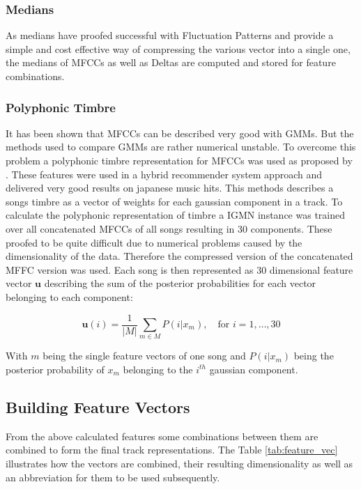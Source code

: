\documentclass[cic,tc,english]{iiufrgs}
\begin{document}
\subsubsection{Medians}
As medians have proofed successful with Fluctuation Patterns and provide a simple and cost effective way of compressing the various vector into a single one, the medians of MFCCs as well as Deltas are computed and stored for feature combinations.

\subsubsection{Polyphonic Timbre} 
It has been shown that MFCCs can be described very good with GMMs. But the methods used to compare GMMs are rather numerical unstable. To overcome this problem a polyphonic timbre representation for MFCCs was used as proposed by \cite{yoshii2008efficient}. These features were used in a hybrid recommender system approach and delivered very good results on japanese music hits. This methods describes a songs timbre as a vector of weights for each gaussian component in a track. To calculate the polyphonic representation of timbre a IGMN \cite{heinen2010incremental} instance was trained over all concatenated MFCCs of all songs resulting in 30 components. These proofed to be quite difficult due to numerical problems caused by the dimensionality of the data. Therefore the compressed version of the concatenated MFFC version was used. Each song is then represented as $30$ dimensional feature vector $\bm{u}$ describing the sum of the posterior probabilities for each vector belonging to each component:

\begin{equation}
\bm{u}(i) = \frac{1}{\vert M \vert} \sum_{m \in M} P(i\vert x_m), \quad \text{for } i = 1, \ldots, 30 
\end{equation}

With $m$ being the single feature vectors of one song and $P(i\vert x_m)$ being the posterior probability of $x_m$ belonging to the $i^{th}$ gaussian component. 


\subsection{Building Feature Vectors}
From the above calculated features some combinations between them are combined to form the final track representations. The Table \ref{tab:feature_vec} illustrates how the vectors are combined, their resulting dimensionality as well as an abbreviation for them to be used subsequently.
\end{document}
